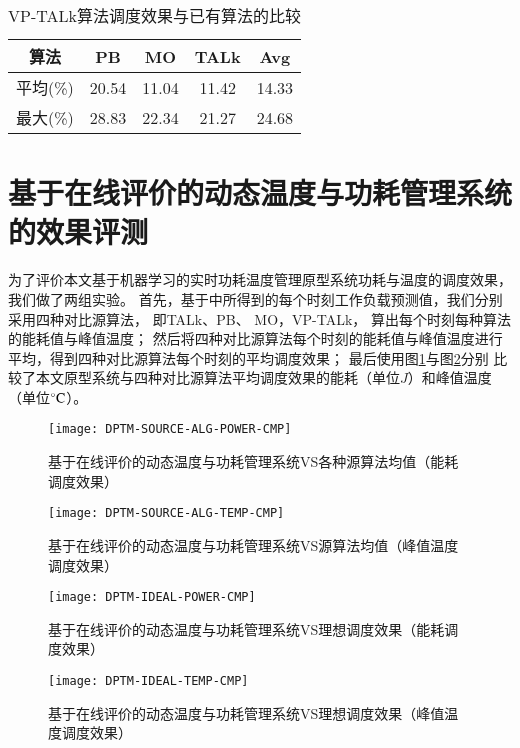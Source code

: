 \begin{table}
\centering
\caption{VP-TALk算法调度效果与已有算法的比较}
\begin{tabular}{c c c c c}
\hline\hline
算法 & PB & MO & TALk & Avg \\ [0.5ex]
\hline
平均(\%) & 20.54 & 11.04 & 11.42 & 14.33 \\
最大(\%) & 28.83 & 22.34 & 21.27 & 24.68 \\
\hline
\end{tabular}
\label{tab:chap3:vp-talk-cmp}
\end{table}

\section{基于在线评价的动态温度与功耗管理系统的效果评测}
为了评价本文基于机器学习的实时功耗温度管理原型系统功耗与温度的调度效果，我们做了两组实验。
首先，基于中所得到的每个时刻工作负载预测值，我们分别采用四种对比源算法， 即TALk、PB、 MO，VP-TALk， 算出每个时刻每种算法的能耗值与峰值温度； 然后将四种对比源算法每个时刻的能耗值与峰值温度进行平均，得到四种对比源算法每个时刻的平均调度效果； 最后使用图\ref{fig:dptm-source-alg-power-cmp}与图\ref{fig:dptm-source-alg-temp-cmp}分别 比较了本文原型系统与四种对比源算法平均调度效果的能耗（单位$J$）和峰值温度（单位$\celsius$）。
\begin{figure}[H]
  \centering
  \texttt{[image: DPTM-SOURCE-ALG-POWER-CMP]}
  \caption{基于在线评价的动态温度与功耗管理系统VS各种源算法均值（能耗调度效果）}
  \label{fig:dptm-source-alg-power-cmp}
\end{figure}
\begin{figure}[H]
  \centering
  \texttt{[image: DPTM-SOURCE-ALG-TEMP-CMP]}
  \caption{基于在线评价的动态温度与功耗管理系统VS源算法均值（峰值温度调度效果）}
  \label{fig:dptm-source-alg-temp-cmp}
\end{figure}
\begin{figure}[H]
  \centering
  \texttt{[image: DPTM-IDEAL-POWER-CMP]}
  \caption{基于在线评价的动态温度与功耗管理系统VS理想调度效果（能耗调度效果）}
  \label{fig:dptm-ideal-power-cmp}
\end{figure}
\begin{figure}[H]
  \centering
  \texttt{[image: DPTM-IDEAL-TEMP-CMP]}
  \caption{基于在线评价的动态温度与功耗管理系统VS理想调度效果（峰值温度调度效果）}
  \label{fig:dptm-ideal-temp-cmp}
\end{figure}

